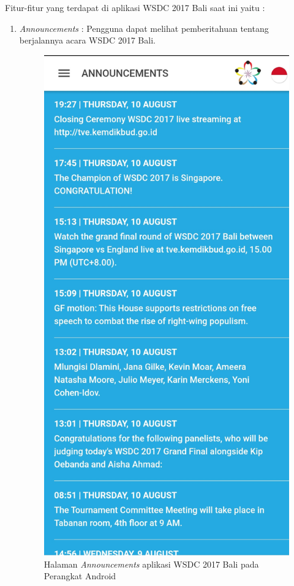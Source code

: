 Fitur-fitur yang terdapat di aplikasi WSDC 2017 Bali saat ini yaitu :

\begin{enumerate}
	\item {\it Announcements} : Pengguna dapat melihat pemberitahuan tentang berjalannya acara WSDC 2017 Bali.

	\begin{figure}[H]
	    \centering
	    \includegraphics[scale=0.12]{Gambar/Announcements.jpg}
	    \caption{Halaman {\it Announcements} aplikasi WSDC 2017 Bali pada Perangkat Android}
	    \label{fig:wsdcappannouncements}
	\end{figure}


\end{enumerate}
